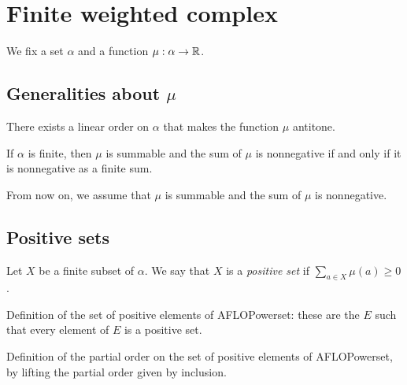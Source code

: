 \section{Finite weighted complex}

We fix a set $\alpha$ and a function $\mu:\alpha\to\mathbb{R}$.

\subsection{Generalities about $\mu$}

\begin{sublemma}
There exists a linear order on $\alpha$ that makes the function $\mu$ antitone. 

\end{sublemma}


\begin{sublemma}
If $\alpha$ is finite, then $\mu$ is summable and the sum of $\mu$ is nonnegative if and only if it is
nonnegative as a finite sum.

\end{sublemma}

From now on, we assume that $\mu$ is summable and the sum of $\mu$ is nonnegative.

\subsection{Positive sets}

\begin{subdefi}[IsPositiveSet]
Let $X$ be a finite subset of $\alpha$. We say that $X$ is a \emph{positive set} if $\sum_{a\in X}\mu(a)\geq 0$.

\end{subdefi}

\begin{subdefi}
Definition of the set of positive elements of AFLOPowerset: these are the $E$ such that every element of $E$ is a positive set.

\end{subdefi}

\begin{subdefi}
Definition of the partial order on the set of positive elements of AFLOPowerset, by lifting the partial order given by inclusion.

\end{subdefi}

